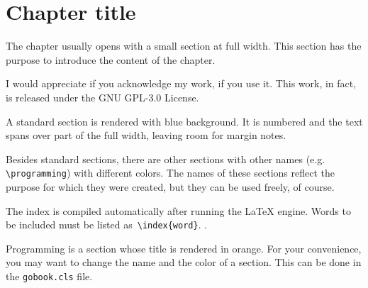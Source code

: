 \chapter{Chapter title}
The chapter usually opens with a small section at full width. This section has the purpose to introduce the content of the chapter.

I would appreciate if you acknowledge my work, if you use it. This work, in fact, is released under the GNU GPL-3.0 License.

\lipsum[1]
A standard section is rendered with blue background. It is numbered and the text spans over part of the full width, leaving room for margin notes. 

Besides standard sections, there are other sections with other names (e.g. {\tt \textbackslash{programming}}) with different colors. The names of these sections reflect the purpose for which they were created, but they can be used freely, of course.

The index is compiled automatically after running the \LaTeX{} engine. Words to be included must be listed as~{\tt \textbackslash{index\{word}\}}. \lipsum[2-4].

Programming is a section whose title is rendered in orange. For your convenience, you may want to change the name and the color of a section. This can be done in the {\tt gobook.cls} file. 

